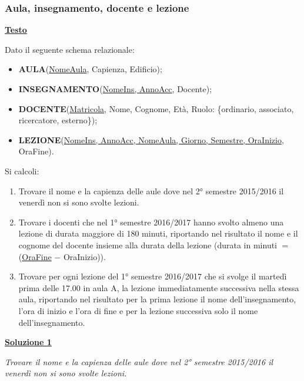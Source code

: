 \documentclass[a4paper]{article}
\begin{document}
	\subsubsection{Aula, insegnamento, docente e lezione}
	
	\textcolor{Red3}{\textbf{\underline{Testo}}}\newline
	
	\noindent
	Dato il seguente schema relazionale:
	\begin{itemize}
		\item \textbf{AULA}(\underline{NomeAula}, Capienza, Edificio);
		\item \textbf{INSEGNAMENTO}(\underline{NomeIns, AnnoAcc}, Docente);
		\item \textbf{DOCENTE}(\underline{Matricola}, Nome, Cognome, Età, Ruolo: \{ordinario, associato, ricercatore, esterno\});
		\item \textbf{LEZIONE}(\underline{NomeIns, AnnoAcc, NomeAula, Giorno, Semestre, OraInizio}, OraFine).
	\end{itemize}
	Si calcoli:
	\begin{enumerate}
		\item Trovare il nome e la capienza delle aule dove nel 2° semestre 2015/2016 il venerdì non si sono svolte lezioni.
		\item Trovare i docenti che nel 1° semestre 2016/2017 hanno svolto almeno una lezione di durata maggiore di 180 minuti, riportando nel risultato il nome e il cognome del docente insieme alla durata della lezione (durata in minuti $=$ (\underline{OraFine} $-$ OraInizio)).
		\item Trovare per ogni lezione del 1° semestre 2016/2017 che si svolge il martedì prima delle 17.00 in aula A, la lezione immediatamente successiva nella stessa aula, riportando nel risultato per la prima lezione il nome dell’insegnamento, l’ora di inizio e l’ora di fine e per la lezione successiva solo il nome dell’insegnamento.
	\end{enumerate}\newpage
	
	\noindent
	\textcolor{Green4}{\textbf{\underline{Soluzione 1}}}\newline
	
	\noindent
	\emph{Trovare il nome e la capienza delle aule dove nel 2° semestre 2015/2016 il venerdì non si sono svolte lezioni.}\newline
\end{document}
